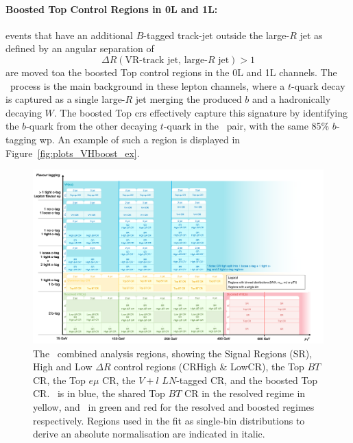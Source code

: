 \paragraph{Boosted Top Control Regions in 0L and 1L:} events that have an additional $B$-tagged track-jet outside the large-$R$ jet as defined by an angular separation of \[\Delta R(\textrm{VR-track jet, large-}R\textrm{ jet}) > 1\] are moved toa the boosted Top control regions in the 0L and 1L channels. The \ttb\ process is the main background in these lepton channels, where a $t$-quark decay is captured as a single large-$R$ jet merging the produced $b$ and a hadronically decaying $W$. The boosted Top \gls{cr}s effectively capture this signature by identifying the $b$-quark from the other decaying $t$-quark in the \ttb\ pair, with the same 85\% $b$-tagging \gls{wp}. An example of such a region is displayed in Figure~\ref{fig:plots_VHboost_ex}.\\

\newpage

\begin{figure}
    \centering
    \includegraphics[width=\textwidth]{Images/VH/Cat/VH_analysis_catCorr.png}
    \caption{The \vhbc\ combined analysis regions, showing the Signal Regions (SR), High and Low $\Delta R$ control regions (CRHigh \& LowCR), the Top $BT$ CR, the Top $e\mu$ CR, the $V+l$ $LN$-tagged CR, and the boosted Top CR. \vhc\ is in blue, the shared Top $BT$ CR in the resolved regime in yellow, and \vhb\ in green and red for the resolved and boosted regimes respectively. Regions used in the fit as single-bin distributions to derive an absolute normalisation are indicated in italic. } 
    \label{fig:ana-strat-det}
\end{figure} %

